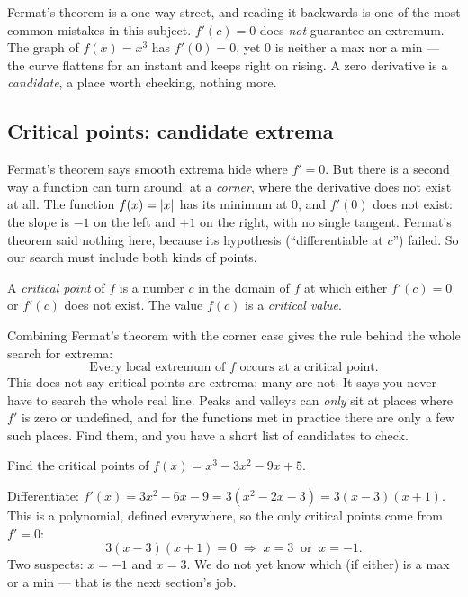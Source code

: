 \begin{trapbox}
Fermat's theorem is a one-way street, and reading it backwards is one of the most
common mistakes in this subject. $f'(c)=0$ does \emph{not} guarantee an
extremum. The graph of $f(x)=x^3$ has $f'(0)=0$, yet $0$ is neither a max nor a
min --- the curve flattens for an instant and keeps right on rising. A zero
derivative is a \emph{candidate}, a place worth checking, nothing more.
\end{trapbox}

\subsection{Critical points: candidate extrema}

Fermat's theorem says smooth extrema hide where $f'=0$. But there is a second way
a function can turn around: at a \emph{corner}, where the derivative does not
exist at all. The function $f(x)=\lvert x\rvert$ has its minimum at $0$, and $f'(0)$
does not exist: the slope is $-1$ on the left and $+1$ on the right, with
no single tangent. Fermat's theorem said nothing here, because its hypothesis
(``differentiable at $c$'') failed. So our search must include both kinds of points.

\begin{definition}\label{ch16:def-critical}
A \emph{critical point} of $f$ is a number $c$ in the domain of $f$ at which either
$f'(c)=0$ or $f'(c)$ does not exist. The value $f(c)$ is a \emph{critical value}.
\end{definition}

\begin{focusbox}
Combining Fermat's theorem with the corner case gives the rule behind the
whole search for extrema:
\[
\boxed{\text{Every local extremum of } f \text{ occurs at a critical point.}}
\]
This does not say critical points are extrema; many are not. It says you never
have to search the whole real line. Peaks and valleys can \emph{only} sit at
places where $f'$ is zero or undefined, and for the functions met in practice
there are only a few such places. Find them, and you have a short list of
candidates to check.
\end{focusbox}

\begin{example}\label{ch16:ex-list-crit}
Find the critical points of $f(x)=x^3-3x^2-9x+5$.

\smallskip
Differentiate: $f'(x)=3x^2-6x-9=3(x^2-2x-3)=3(x-3)(x+1)$. This is a polynomial,
defined everywhere, so the only critical points come from $f'=0$:
\[
3(x-3)(x+1)=0 \;\Longrightarrow\; x=3 \ \text{ or } \ x=-1.
\]
Two suspects: $x=-1$ and $x=3$. We do not yet know which (if either) is a max or a
min --- that is the next section's job.
\end{example}

